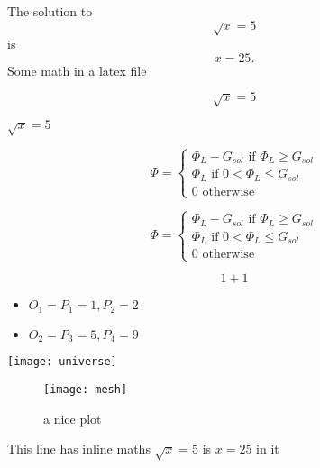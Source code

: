 \documentclass{article}
\begin{document}
The solution to \[\sqrt{x} = 5\] is \[x=25.\]
Some math in a latex file


\[\sqrt{x} = 5\]

\(\sqrt{x} = 5\)

$$
\Phi = \begin{cases}
\Phi_L - G_{sol} \text{ if } \Phi_L \geq G_{sol}\\
\Phi_L \text{ if }  0 <\Phi_L \leq G_{sol}\\
0 \text{ otherwise }
\end{cases}
$$

\begin{equation}
\Phi = \begin{cases}
\Phi_L - G_{sol} \text{ if } \Phi_L \geq G_{sol}\\
\Phi_L \text{ if }  0 <\Phi_L \leq G_{sol}\\
0 \text{ otherwise }
\end{cases}
\end{equation}



\begin{equation}
  1+1
\end{equation}


\begin{itemize}
\item $O_1 = {P_1 = {1}, P_2 = {2}}$
\item $O_2 = {P_3 = {5}, P_4 = {9}}$
\end{itemize}


\texttt{[image: universe]}

\begin{figure}[h]
    \centering
    \texttt{[image: mesh]}
    \caption{a nice plot}
    \label{fig:mesh1}
\end{figure}


This line has inline maths $\sqrt{x} = 5$ is $x=25$ in it
\end{document}
